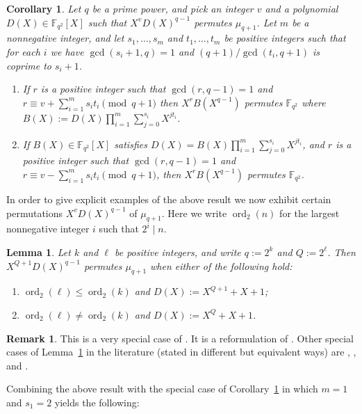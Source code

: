 \documentclass[11pt]{amsart}
\newtheorem{lemma}[equation]{Lemma}
\newtheorem{cor}[equation]{Corollary}
\theoremstyle{definition}
\newtheorem*{rmk}{Remark}
\newcommand{\F}{\mathbb{F}}
\DeclareMathOperator{\ord}{ord}
\begin{document}
\begin{cor}\label{main}
Let $q$ be a prime power, and pick an integer $v$ and a polynomial $D(X)\in\F_{q^2}[X]$ such that $X^v D(X)^{q-1}$ permutes $\mu_{q+1}$.
Let $m$ be a nonnegative integer, and let $s_1,\dots,s_m$ and $t_1,\dots,t_m$ be positive integers such that for each $i$ we have $\gcd(s_i+1,q)=1$ and $(q+1)/\gcd(t_i,q+1)$ is coprime to $s_i+1$.
\begin{enumerate}
\item\label{31} If $r$ is a positive integer such that $\gcd(r,q-1)=1$ and $r\equiv v+\sum_{i=1}^m s_it_i\pmod{q+1}$ then $X^r B(X^{q-1})$ permutes\/ $\F_{q^2}$ where $B(X):=D(X)\prod_{i=1}^m \sum_{j=0}^{s_i} X^{jt_i}$. 
\item\label{32} If $B(X)\in\F_{q^2}[X]$ satisfies $D(X)=B(X)\prod_{i=1}^m\sum_{j=0}^{s_i} X^{jt_i}$, and $r$ is a positive integer such that $\gcd(r,q-1)=1$ and $r\equiv v-\sum_{i=1}^m s_it_i\pmod{q+1}$, then $X^r B(X^{q-1})$ permutes\/ $\F_{q^2}$.
\end{enumerate}
\end{cor}

In order to give explicit examples of the above result we now exhibit certain permutations $X^v D(X)^{q-1}$ of $\mu_{q+1}$.  Here we write $\ord_2(n)$ for the largest nonnegative integer $i$ such that $2^i\mid n$.

\begin{lemma}\label{pp}
Let $k$ and $\ell$ be positive integers, and write $q:=2^k$ and $Q:=2^\ell$.  Then $X^{Q+1} D(X)^{q-1}$ permutes $\mu_{q+1}$ when either of the following hold:
\begin{enumerate}
\item\label{41} $\ord_2(\ell)\le\ord_2(k)$ and $D(X):=X^{Q+1}+X+1$;
\item\label{42} $\ord_2(\ell)\ne\ord_2(k)$ and $D(X):=X^Q+X+1$.
\end{enumerate}
\end{lemma}

\begin{rmk}
This is a very special case of \cite[Thm.~1.3]{DZquad}.
It is a reformulation of \cite[Thm.~1 and 2]{LHnewtri}.  Other special cases of Lemma~\ref{pp} in the literature (stated in different but equivalent ways) are \cite[Thm.~3.1]{WZZ},
\cite[Cor.~3.8 and 3.10--3.12]{WYDM}, and \cite[Thm.~1.1]{Zx}.
\end{rmk}

Combining the above result with the special case of Corollary~\ref{main} in which $m=1$ and $s_1=2$ yields the following:
\end{document}
